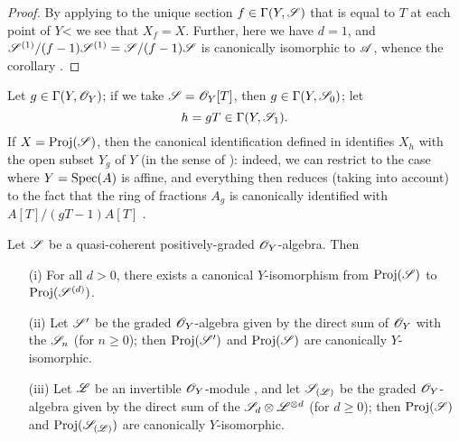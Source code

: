 \begin{proof}
By applying  to the unique section $f\in\Gamma(Y,\mathscr{S})$ that is equal to $T$ at each point of $Y$< we see that $X_f=X$.
Further, here we have $d=1$, and $\mathscr{S}^{(1)}/(f-1)\mathscr{S}^{(1)}=\mathscr{S}/(f-1)\mathscr{S}$ is canonically isomorphic to $\mathscr{A}$, whence the corollary .
\end{proof}

Let $g\in\Gamma(Y,\mathscr{O}_Y)$;
if we take $\mathscr{S}=\mathscr{O}_Y[T]$, then $g\in\Gamma(Y,\mathscr{S}_0)$;
let
\[
  h = gT\in\Gamma(Y,\mathscr{S}_1).
\]
If $X=\operatorname{Proj}(\mathscr{S})$, then the canonical identification defined in  identifies $X_h$ with the open subset $Y_g$ of $Y$ (in the sense of ):
indeed, we can restrict to the case where $Y=\operatorname{Spec}(A)$ is affine, and everything then reduces (taking  into account) to the fact that the ring of fractions $A_g$ is canonically identified with $A[T]/(gT-1)A[T]$ .

\begin{proposition}[3.1.8]
\label{II.3.1.8}
Let $\mathscr{S}$ be a quasi-coherent positively-graded $\mathscr{O}_Y$-algebra.
Then
\begin{enumerate}
  \item[(i)] For all $d>0$, there exists a canonical $Y$-isomorphism from $\operatorname{Proj}(\mathscr{S})$ to $\operatorname{Proj}(\mathscr{S}^{(d)})$.
  \item[(ii)] Let $\mathscr{S}'$ be the graded $\mathscr{O}_Y$-algebra given by the direct sum of $\mathscr{O}_Y$ with the $\mathscr{S}_n$ (for $n\geq0$);
    then $\operatorname{Proj}(\mathscr{S}')$ and $\operatorname{Proj}(\mathscr{S})$ are canonically $Y$-isomorphic.
  \item[(iii)] Let $\mathscr{L}$ be an invertible $\mathscr{O}_Y$-module , and let $\mathscr{S}_{(\mathscr{L})}$ be the graded $\mathscr{O}_Y$-algebra given by the direct sum of the $\mathscr{S}_d\otimes\mathscr{L}^{\otimes d}$ (for $d\geq0$);
    then $\operatorname{Proj}(\mathscr{S})$ and $\operatorname{Proj}(\mathscr{S}_{(\mathscr{L})})$ are canonically $Y$-isomorphic.
\end{enumerate}
\end{proposition}

